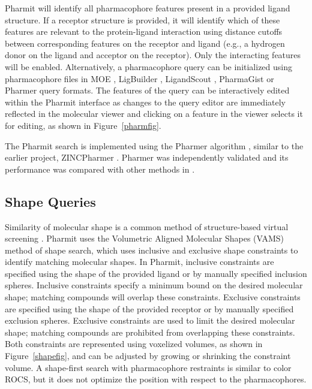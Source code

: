Pharmit will identify all pharmacophore features present in a provided ligand structure. If a receptor structure is provided, it will identify which of these features are relevant to the protein-ligand interaction using distance cutoffs between corresponding features on the receptor and ligand (e.g., a hydrogen donor on the ligand and acceptor on the receptor). Only the interacting features will be enabled. Alternatively, a pharmacophore query can be initialized using pharmacophore files in MOE \cite{moe}, LigBuilder \cite{Wang_2000}, LigandScout \cite{Wolber_2005}, PharmaGist \cite{Schneidman_Duhovny_2008} or Pharmer \cite{Koes_2011} query formats.  The features of the query can be interactively edited within the Pharmit interface as changes to the query editor are immediately reflected in the molecular viewer and clicking on a feature in the viewer selects it for editing, as shown in Figure~\ref{pharmfig}.

The Pharmit search is implemented using the Pharmer algorithm \cite{Koes_2011}, similar to the earlier project, ZINCPharmer \cite{Koes_2012}.  Pharmer was independently validated and its performance was compared with other methods in \cite{Sanders_2012}.


\subsection{Shape Queries}

Similarity of molecular shape is a common method of structure-based virtual screening \cite{Nicholls_2010}.  Pharmit uses the Volumetric Aligned Molecular Shapes (VAMS) \cite{vams} method of shape search, which uses inclusive and exclusive shape constraints to identify matching molecular shapes.  In Pharmit, inclusive constraints are specified using the shape of the provided ligand or by manually specified inclusion spheres. Inclusive constraints specify a minimum bound on the desired molecular shape; matching compounds will overlap these constraints. Exclusive constraints are specified using the shape of the provided receptor or by manually specified exclusion spheres.  Exclusive constraints are used to limit the desired molecular shape; matching compounds are prohibited from overlapping these constraints.  Both constraints are represented using voxelized volumes, as shown in Figure~\ref{shapefig}, and can be adjusted by growing or shrinking the constraint volume. A shape-first search with pharmacophore restraints is similar to color ROCS, but it does not optimize the position with respect to the pharmacophores.

